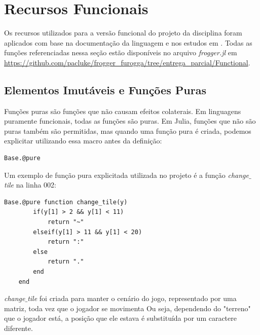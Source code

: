 \documentclass[rel_mlp]{iiufrgs}
\begin{document}
 


 \chapter{Recursos Funcionais}
 
 Os recursos utilizados para a versão funcional do projeto da disciplina foram aplicados com base na documentação da linguagem \cite{Doc} e nos estudos em \cite{FuncPart}. Todas as funções referenciadas nessa seção estão disponíveis no arquivo \textit{frogger.jl} em \url{https://github.com/pacluke/frogger_furogga/tree/entrega_parcial/Functional}.
 
 \section{Elementos Imutáveis e Funções Puras}
 
 Funções puras são funções que não causam efeitos colaterais. Em linguagens puramente funcionais, todas as funções são puras. Em Julia, funções que não são puras também são permitidas, mas quando uma função pura é criada, podemos explicitar utilizando essa macro antes da definição:
    \begin{lstlisting}[frame=single]
    Base.@pure
    \end{lstlisting}
    
 Um exemplo de função pura explicitada utilizada no projeto é a função \textit{change$\_$tile} na linha 002:
    \begin{lstlisting}[frame=single]
    Base.@pure function change_tile(y)
    	if(y[1] > 2 && y[1] < 11)
    		return "~"
    	elseif(y[1] > 11 && y[1] < 20)
    		return ":"
    	else
    		return "."
    	end
    end
    \end{lstlisting}
    
   \textit{change$\_$tile} foi criada para manter o cenário do jogo, representado por uma matriz, toda vez que o jogador se movimenta Ou seja, dependendo do "terreno" que o jogador está, a posição que ele estava é substituída por um caractere diferente.
 
\end{document}
